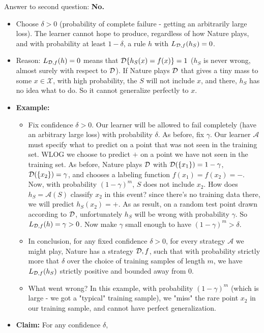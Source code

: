 \documentclass[11pt]{article}
\newcommand{\Ac}{\mathcal{A}}
\newcommand{\Xc}{\mathcal{X}}
\begin{document}
{Answer to second question: {\bf No.}
 \begin{itemize}%
  \item Choose $\delta>0$ (probability of complete failure - getting an
    arbitrarily large loss). The learner cannot
    hope to produce, regardless of how Nature plays, and with probability at
    least $1-\delta$, a
     rule $h$ with $L_{\mathcal{D},f}(h_S)=0$.
   \item Reason: $L_{\mathcal{D},f}(h)=0$ means that $\mathcal{D}\{h_S(x)= f(x)\}=1$
     ($h_S$ is never wrong, almost surely with respect to $\mathcal{D}$). 
     If Nature plays $\mathcal{D}$ that gives a
     tiny mass to some $x\in\Xc$, with high probability, the
     $S$ will not include $x$, and there, $h_S$ has no
     idea what to do. So it cannot generalize perfectly to $x$.
    \item {\bf Example:}
    \begin{itemize}
        \item Fix confidence $\delta>0$. Our learner will be allowed to fail
	  completely (have an arbitrary large loss) with probability $\delta$.
	  As before, fix $\gamma$. Our learner $\Ac$ must specify what to predict on a point that was not seen in the training set. WLOG we choose to predict $+$ on a point we have not seen in the training set. As before, Nature plays $\mathcal{D}$ with
     $\mathcal{D}(\{x_1\}) = 1-\gamma$, $\mathcal{D}(\{x_2\}) = \gamma$, and chooses a labeling function $f(x_1)=f(x_2)=-$. 
    Now, with probability
     $(1-\gamma)^m$, $S$ does not include $x_2$. 
     How does $h_S=\Ac(S)$
     classify $x_2$ in this event? since there's no training data there, we will predict $h_S(x_2)=+$.
     As as result, on a random test point drawn according to $\mathcal{D}$, unfortunately $h_S$ will be wrong with probability $\gamma$. So
     $L_{\mathcal{D},f}(h)=\gamma>0$. Now make $\gamma$ small enough to have $(1-\gamma)^m > \delta$.
     \item In conclusion, for any fixed confidence $\delta>0$, 
     for every strategy $\Ac$ we might play, Nature has a strategy $\mathcal{D},f$, such that 
     with probability strictly more that $\delta$ over the choice of training samples of length $m$, we have  
     $L_{\mathcal{D},f}(h_S)$ strictly positive and bounded away from $0$.
     \item What went wrong? In this example, with probability $(1-\gamma)^m$ (which is large - we got a "typical" training sample), we "miss" the rare point $x_2$ in our training sample, and cannot have perfect generalization. 
     \end{itemize}
  \item {\bf Claim:} For any confidence $\delta$, 

\end{itemize}}
\end{document}
